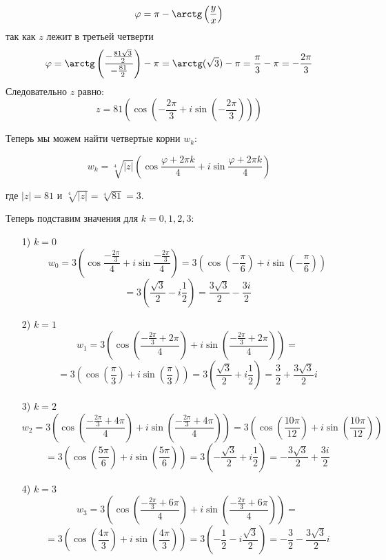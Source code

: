 \documentclass[a4paper]{article}
\renewcommand{\f}[2]{\frac{#1}{#2}}
\begin{document}
\begin{enumerate}
    $$
    \varphi =\pi - \arctg\left(\frac{y}{x}\right)
    $$
    так как $z$ лежит в третьей четверти
    $$
    \varphi = \arctg\left(\frac{-\frac{81 \sqrt{3}}{2}}{-\frac{81}{2}}\right)-\pi = \arctg(\sqrt{3})-\pi = \frac{\pi}{3}-\pi = -\f{2\pi}{3}
    $$
    Следовательно $z$ равно:
    $$z = 81(\cos(-\f{2\pi}{3} + i\sin(-\f{2\pi}{3})))$$
    
    Теперь мы можем найти четвертые корни $ w_k $:

    $$
    w_k = \sqrt[4]{|z|}\left(\cos \frac{\varphi + 2\pi k}{4} + i \sin \frac{\varphi + 2\pi k}{4}\right)
    $$
    
    где $ |z| = 81 $ и $ \sqrt[4]{|z|} = \sqrt[4]{81} = 3 $.

    Теперь подставим значения для $ k = 0, 1, 2, 3 $:
    \begin{enumerate}
        \item[1)] $k = 0$\\
        $$
        w_0 = 3 \left( \cos \frac{-\frac{2\pi}{3}}{4} + i \sin \frac{-\frac{2\pi}{3}}{4} \right) = 3 \left( \cos \left(-\frac{\pi}{6}\right) + i \sin \left(-\frac{\pi}{6}\right) \right)
        $$
        $$
        = 3 \left( \frac{\sqrt{3}}{2} - i \frac{1}{2} \right) = \frac{3\sqrt{3}}{2} - \frac{3i}{2}
        $$
        \item[2)]$k=1$\\
        $$
        w_1 = 3 \left( \cos \left(\frac{-\frac{2\pi}{3} + 2\pi}{4}\right) + i \sin \left(\frac{-\frac{2\pi}{3} + 2\pi}{4}\right) \right) =
        $$
        $$
        = 3 \left( \cos \left(\frac{\pi}{3}\right) + i \sin \left(\frac{\pi}{3}\right) \right) = 3 \left( \frac{\sqrt{3}}{2} + i \frac{1}{2} \right) = \frac{3}{2} + \frac{3\sqrt{3}}{2}i
        $$
        \item[3)]$k=2$\\
        $$
        w_2 = 3 \left( \cos \left(\frac{-\frac{2\pi}{3} + 4\pi}{4}\right) + i \sin \left(\frac{-\frac{2\pi}{3} + 4\pi}{4}\right) \right) = 3 \left( \cos \left(\frac{10\pi}{12}\right) + i \sin \left(\frac{10\pi}{12}\right) \right)
        $$
        $$
        = 3 \left( \cos \left(\frac{5\pi}{6}\right) + i \sin \left(\frac{5\pi}{6}\right) \right) = 3 \left( -\frac{\sqrt{3}}{2} + i \frac{1}{2} \right) = -\frac{3\sqrt{3}}{2} + \frac{3i}{2}
        $$
        \item[4)]$k=3$\\
        $$
        w_3 = 3 \left( \cos \left(\frac{-\frac{2\pi}{3} + 6\pi}{4}\right) + i \sin \left(\frac{-\frac{2\pi}{3} + 6\pi}{4}\right) \right) = 
        $$
        $$
        = 3 \left( \cos \left(\frac{4\pi}{3}\right) + i \sin \left(\frac{4\pi}{3}\right) \right) = 3 \left( -\frac{1}{2} - i \frac{\sqrt{3}}{2} \right) = -\frac{3}{2} - \frac{3\sqrt{3}}{2} i
        $$
        

\end{enumerate}
\end{enumerate}
\end{document}
